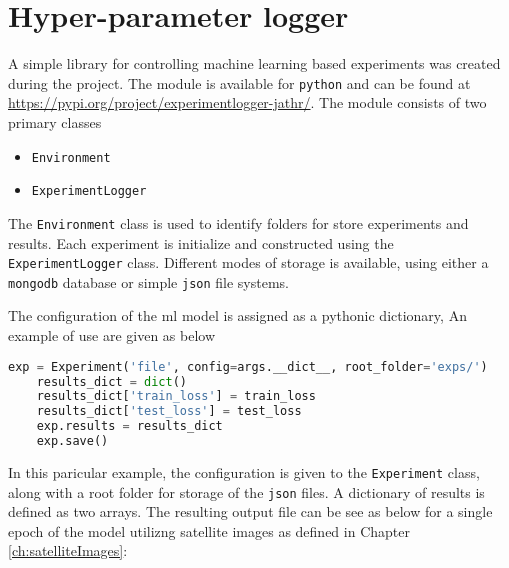 \chapter{Hyper-parameter logger}

A simple library for controlling machine learning based experiments was created during the project. The module is available for \texttt{python} and can be found at \url{https://pypi.org/project/experimentlogger-jathr/}. The module consists of two primary classes

\begin{itemize}
    \item \texttt{Environment}
    \item \texttt{ExperimentLogger}
\end{itemize}


The \texttt{Environment} class is used to identify folders for store experiments and results. Each experiment is initialize and constructed using the \texttt{ExperimentLogger} class. Different modes of storage is available, using either a \texttt{mongodb} database or simple \texttt{json} file systems.

The configuration of the \gls{ml} model is assigned as a pythonic dictionary, An example of use are given as below 

\begin{lstlisting}[language=Python, basicstyle=\footnotesize, keywordstyle=\color{deepblue}, emphstyle=\color{deepred}, stringstyle=\color{deepgreen}]
    exp = Experiment('file', config=args.__dict__, root_folder='exps/')
    results_dict = dict()
    results_dict['train_loss'] = train_loss
    results_dict['test_loss'] = test_loss
    exp.results = results_dict
    exp.save()
\end{lstlisting}

In this paricular example, the configuration is given to the \texttt{Experiment} class, along with a root folder for storage of the \texttt{json} files. A dictionary of results is defined as two arrays. The resulting output file can be see as below for a single epoch of the model utilizng satellite images as defined in Chapter \ref{ch:satelliteImages}:

